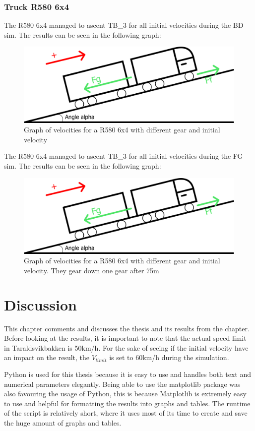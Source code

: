 \documentclass[noprint]{uit-thesis}
\begin{document}
\subsection{Truck R580 6x4}
The R580 6x4 managed to ascent TB\_3 for all initial velocities during the BD sim. The results can be seen in the following graph:
\begin{figure}[H]
\includegraphics[width=\textwidth, height=0.45\textheight]{photo/freeBodyDiagram.png}
\caption{Graph of velocities for a R580 6x4 with different gear and initial velocity}
\label{fig:TB36x4}
\end{figure}

The R580 6x4 managed to ascent TB\_3 for all initial velocities during the FG sim. The results can be seen in the following graph:
\begin{figure}[H]
\includegraphics[width=\textwidth, height=0.45\textheight]{photo/freeBodyDiagram.png}
\caption{Graph of velocities for a R580 6x4 with different gear and initial velocity. They gear down one gear after 75m}
\label{fig:TB36x4GR}
\end{figure}

\chapter{Discussion}
This chapter comments and discusses the thesis and its results from the  chapter. Before looking at the results, it is important to note that the actual speed limit in Taraldsvikbakken is 50km/h. For the sake of seeing if the initial velocity have an impact on the result, the $V_{limit}$ is set to 60km/h during the simulation.
\par 
Python is used for this thesis because it is easy to use and handles both text and numerical parameters elegantly. Being able to use the matplotlib package was also favouring the usage of Python, this is because Matplotlib is extremely easy to use and helpful for formatting the results into graphs and tables. The runtime of the script is relatively short, where it uses most of its time to create and save the huge amount of graphs and tables.
\end{document}
